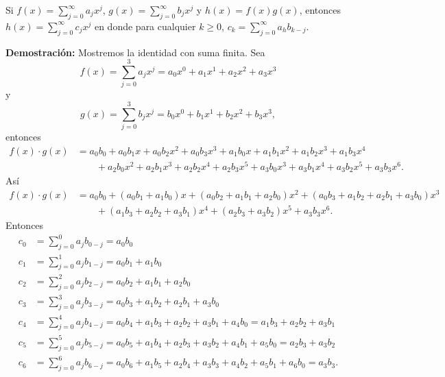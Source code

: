 \begin{theorem}{}{}
    Si $\displaystyle f(x) = \sum_{j=0}^{\infty} a_j x^j$, $\displaystyle g(x) = \sum_{j=0}^{\infty} b_j x^j$ y $h(x) = f(x)g(x)$, entonces $\displaystyle h(x) = \sum_{j=0}^{\infty} c_j x^j$ en donde para cualquier $k \geq 0$, $\displaystyle c_k = \sum_{j=0}^{\infty} a_h b_{k-j}$.

    \tcblower
    \textbf{\color{jblueleft}Demostración:} Mostremos la identidad con suma finita. Sea
    $$f(x) = \sum_{j=0}^{3} a_j x^j = a_0x^0 + a_1x^1 + a_2x^2 + a_3x^3$$
    y
    $$g(x) = \sum_{j=0}^{3} b_j x^j = b_0x^0 + b_1x^1 + b_2x^2 + b_3x^3,$$
    entonces
	\begin{align*}
		f(x) \cdot g(x) & = a_0 b_0 + a_0 b_1 x + a_0 b_2 x^2 + a_0 b_3 x^3 + a_1 b_0 x + a_1 b_1 x^2 + a_1 b_2 x^3 + a_1 b_3 x^4 \\
		& \quad\quad + a_2 b_0 x^2 + a_2 b_1 x^3 + a_2 b_2 x^4 + a_2 b_3 x^5 + a_3 b_0 x^3 + a_3 b_1 x^4 + a_3 b_2 x^5 + a_3 b_3 x^6.
	\end{align*}
	Así
	\begin{align*}
		f(x) \cdot g(x) & = a_0 b_0 + (a_0b_1 + a_1 b_0 ) x + (a_0 b_2 + a_1 b_1 + a_2 b_0) x^2 + (a_0 b_3 + a_1 b_2 + a_2 b_1 + a_3 b_0) x^3 \\
        & \quad\quad + (a_1 b_3 +a_2 b_2 + a_3 b_1) x^4 + (a_2 b_3 + a_3 b_2)x^5 + a_3 b_3 x^6.
	\end{align*}
	Entonces
	\begin{align*}
		c_0 & = \sum_{j=0}^{0}a_j b_{0-j} = a_0 b_0 \\
		c_1 & = \sum_{j=0}^{1}a_j b_{1-j} = a_0 b_1 + a_1 b_0 \\
		c_2 & = \sum_{j=0}^{2}a_j b_{2-j} = a_0b_2 + a_1b_1 + a_2b_0 \\
		c_3 & = \sum_{j=0}^{3}a_j b_{3-j} = a_0b_3 + a_1b_2 + a_2b_1 + a_3b_0 \\
		c_4 & = \sum_{j=0}^{4}a_j b_{4-j} = a_0b_4 + a_1b_3 + a_2b_2 + a_3b_1 + a_4b_0 = a_1b_3 + a_2b_2 + a_3b_1 \\
		c_5 & = \sum_{j=0}^{5}a_j b_{5-j} = a_0b_5 + a_1b_4 + a_2b_3 + a_3b_2 + a_4b_1 + a_5b_0 = a_2 b_3 + a_3 b_2 \\
		c_6 & = \sum_{j=0}^{6}a_j b_{6-j} = a_0b_6 + a_1b_5 + a_2b_4 + a_3b_3 + a_4b_2 + a_5b_1 + a_6b_0 = a_3 b_3.
	\end{align*}
\end{theorem}


